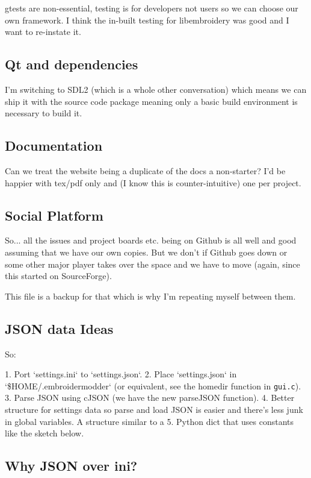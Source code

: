 \documentclass[a4paper]{report}
\begin{document}
gtests are non-essential, testing is for developers not users so we can
choose our own framework. I think the in-built testing for libembroidery
was good and I want to re-instate it.

\subsection{Qt and dependencies}

I'm switching to SDL2 (which is a whole other conversation) which means
we can ship it with the source code package meaning only a basic build
environment is necessary to build it.

\subsection{Documentation}

Can we treat the website being a duplicate of the docs a non-starter?
I'd be happier with tex/pdf only and (I know this is counter-intuitive)
one per project.

\subsection{Social Platform}

So... all the issues and project boards etc. being on Github is all well and good assuming that we have our own copies. But we don't if Github goes down or some other major player takes over the space and we have to move (again, since this started on SourceForge).

This file is a backup for that which is why I'm repeating myself between them.

\subsection{JSON data Ideas}

So:

1. Port `settings.ini` to `settings.json`.
2. Place `settings.json` in `\$HOME/.embroidermodder` (or equivalent, see the homedir function in \texttt{gui.c}).
3. Parse JSON using cJSON (we have the new parseJSON function).
4. Better structure for settings data so parse and load JSON is easier and
   there's less junk in global variables. A structure similar to a
5. Python dict that uses constants like the sketch below.

\subsection{Why JSON over ini?}
\end{document}
